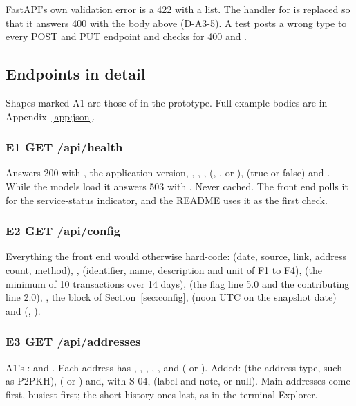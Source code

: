 \begin{caution}
FastAPI's own validation error is a 422 with a  list. The handler for
 is replaced so that it answers 400 with the body above (D-A3-5). A
test posts a wrong type to every POST and PUT endpoint and checks for 400 and .
\end{caution}

\subsection{Endpoints in detail}

Shapes marked A1 are those of  in the prototype. Full example bodies
are in Appendix~\ref{app:json}.

\subsubsection*{E1 \quad GET /api/health}
Answers 200 with , the application version, ,
, ,  (, ,
 or ),  (true or false) and . While the
models load it answers 503 with . Never cached. The front end polls it
for the service-status indicator, and the README uses it as the first check.

\subsubsection*{E2 \quad GET /api/config}
Everything the front end would otherwise hard-code:  (date, source, link, address
count, method), ,  (identifier, name, description and unit of F1
to F4),  (the minimum of 10 transactions over 14 days),  (the flag
line 5.0 and the contributing line 2.0), , the  block of
Section~\ref{sec:config},  (noon UTC on the snapshot date) and
 (, ).

\subsubsection*{E3 \quad GET /api/addresses}
A1's :  and . Each address has
, , , , ,
 and  ( or ). Added:
 (the address type, such as P2PKH),  ( or ) and,
with S-04,  (label and note, or null). Main addresses come first, busiest first; the
short-history ones last, as in the terminal Explorer.

